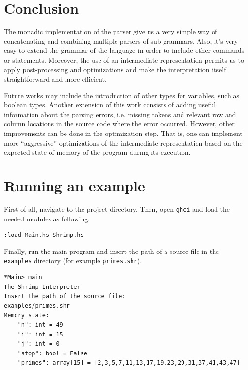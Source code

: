 \documentclass[12pt,a4paper]{article}
\begin{document}
\section*{Conclusion}
The monadic implementation of the parser give us a very simple way of concatenating and combining multiple parsers of sub-grammars.
Also, it's very easy to extend the grammar of the language in order to include other commands or statements.
Moreover, the use of an intermediate representation permits us to apply post-processing and optimizations and make the interpretation itself straightforward and more efficient.

Future works may include the introduction of other types for variables, such as boolean types.
Another extension of this work consists of adding useful information about the parsing errors, i.e. missing tokens and relevant row and column locations in the source code where the error occurred.
However, other improvements can be done in the optimization step.
That is, one can implement more ``aggressive'' optimizations of the intermediate representation based on the expected state of memory of the program during its execution.

\clearpage

\section*{Running an example}
First of all, navigate to the project directory.
Then, open \texttt{ghci} and load the needed modules as following.
\begin{lstlisting}[style=custom-style]
:load Main.hs Shrimp.hs
\end{lstlisting}
Finally, run the main program and insert the path of a source file in the \texttt{examples} directory (for example \texttt{primes.shr}).
\begin{lstlisting}[style=custom-style]
*Main> main
The Shrimp Interpreter
Insert the path of the source file:
examples/primes.shr
Memory state:
    "n": int = 49
    "i": int = 15
    "j": int = 0
    "stop": bool = False
    "primes": array[15] = [2,3,5,7,11,13,17,19,23,29,31,37,41,43,47]
\end{lstlisting}
\end{document}
